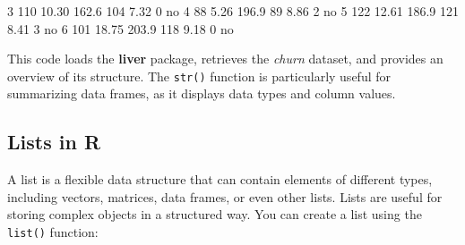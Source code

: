 \documentclass[
  11pt,
]{book}
\makeatletter
\newenvironment{Shaded}{}{}
\newcommand{\DecValTok}[1]{#1}
\newcommand{\FloatTok}[1]{#1}
\newcommand{\NormalTok}[1]{#1}
\newenvironment{kframe}{%
\medskip{}
\setlength{\fboxsep}{.8em}
 \def\at@end@of@kframe{}%
 \ifinner\ifhmode%
  \def\at@end@of@kframe{\end{minipage}}%
  \begin{minipage}{\columnwidth}%
 \fi\fi%
 \def\FrameCommand##1{\hskip\@totalleftmargin \hskip-\fboxsep
 \colorbox{shadecolor}{##1}\hskip-\fboxsep
     \hskip-\linewidth \hskip-\@totalleftmargin \hskip\columnwidth}%
 \MakeFramed {\advance\hsize-\width
   \@totalleftmargin\z@ \linewidth\hsize
   \@setminipage}}%
 {\par\unskip\endMakeFramed%
 \at@end@of@kframe}
\renewenvironment{Shaded}{\begin{kframe}}{\end{kframe}}
\theoremstyle{definition}
\theoremstyle{definition}
\theoremstyle{definition}
\theoremstyle{definition}
\theoremstyle{remark}
\makeatother
\begin{document}
\begin{Shaded}
\begin{Highlighting}[]
   \DecValTok{3}       \DecValTok{110}      \FloatTok{10.30}      \FloatTok{162.6}         \DecValTok{104}         \FloatTok{7.32}              \DecValTok{0}\NormalTok{    no}
   \DecValTok{4}        \DecValTok{88}       \FloatTok{5.26}      \FloatTok{196.9}          \DecValTok{89}         \FloatTok{8.86}              \DecValTok{2}\NormalTok{    no}
   \DecValTok{5}       \DecValTok{122}      \FloatTok{12.61}      \FloatTok{186.9}         \DecValTok{121}         \FloatTok{8.41}              \DecValTok{3}\NormalTok{    no}
   \DecValTok{6}       \DecValTok{101}      \FloatTok{18.75}      \FloatTok{203.9}         \DecValTok{118}         \FloatTok{9.18}              \DecValTok{0}\NormalTok{    no}
\end{Highlighting}
\end{Shaded}

This code loads the \textbf{liver} package, retrieves the \emph{churn} dataset, and provides an overview of its structure. The \texttt{str()} function is particularly useful for summarizing data frames, as it displays data types and column values.

\subsection*{Lists in R}\label{lists-in-r}


A list is a flexible data structure that can contain elements of different types, including vectors, matrices, data frames, or even other lists. Lists are useful for storing complex objects in a structured way. You can create a list using the \texttt{list()} function:
\end{document}

